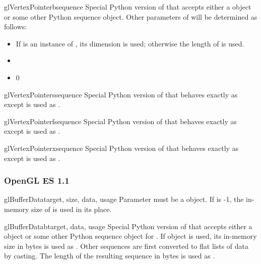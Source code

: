 \begin{funcdesc}{glVertexPointerb}{sequence}
Special Python version of  that accepts either a
 object or some other Python sequence object.
Other parameters of  will be determined as follows:
\begin{itemize}
\item {} If  is an instance of , its dimension is used; otherwise the length of  is used.
\item {} 
\item {} 0
\end{itemize}
\end{funcdesc}

\begin{funcdesc}{glVertexPointers}{sequence}
Special Python version of  that behaves exactly as
 except  is used as .
\end{funcdesc}

\begin{funcdesc}{glVertexPointerf}{sequence}
Special Python version of  that behaves exactly as
 except  is used as .
\end{funcdesc}

\begin{funcdesc}{glVertexPointerx}{sequence}
Special Python version of  that behaves exactly as
 except  is used as .
\end{funcdesc}

\subsubsection{OpenGL ES 1.1}

\begin{funcdesc}{glBufferData}{target, size, data, usage}
Parameter  must be a  object. If  is -1,
the in-memory size of  is used in its place.
\end{funcdesc}

\begin{funcdesc}{glBufferDatab}{target, data, usage}
Special Python version of  that accepts either a
 object or some other Python sequence object for .
If  object is used, its in-memory size in bytes is used as
. Other sequences are first converted to flat lists of
 data by casting. The length of the resulting sequence in bytes
is used as .
\end{funcdesc}

